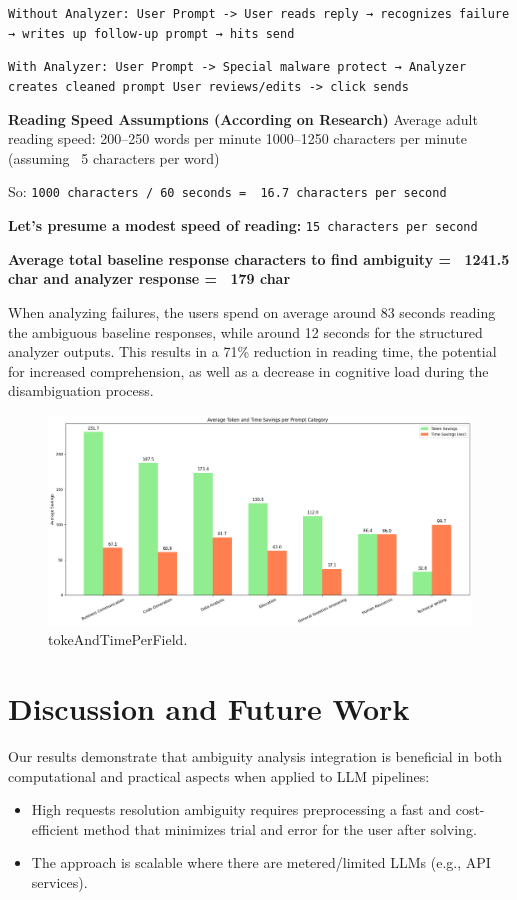\documentclass[11pt,a4paper]{article}
\begin{document}
\texttt{Without Analyzer: User Prompt -> User reads reply → recognizes failure → writes up follow-up prompt → hits send}

\texttt{With Analyzer: User Prompt -> Special malware protect → Analyzer creates cleaned prompt User reviews/edits -> click sends}

\textbf{Reading Speed Assumptions (According on Research)}
Average adult reading speed:
200–250 words per minute
1000–1250 characters per minute (assuming ~5 characters per word)

So:
\texttt{1000 characters / 60 seconds = ~16.7 characters per second}

\textbf{Let's presume a modest speed of reading:}
\texttt{15 characters per second}

\textbf{Average total baseline response characters to find ambiguity = ~1241.5 char and analyzer response = ~179 char}

When analyzing failures, the users spend on average around 83 seconds reading the ambiguous baseline responses, while around 12 seconds for the structured analyzer outputs. This results in a 71\% reduction in reading time, the potential for increased comprehension, as well as a decrease in cognitive load during the disambiguation process.

\begin{figure}[!t]
\centering
\includegraphics[width=\columnwidth]{images/Figure5.jpeg}
\caption{tokeAndTimePerField.}
\label{fig_timeperfield}
\end{figure}

\section{Discussion and Future Work}
Our results demonstrate that ambiguity analysis integration is beneficial in both computational and practical aspects when applied to LLM pipelines:
\begin{itemize}
    \item High requests resolution ambiguity requires preprocessing a fast and cost-efficient method that minimizes trial and error for the user after solving.
    \item The approach is scalable where there are metered/limited LLMs (e.g., API services).
\end{itemize}
\end{document}
